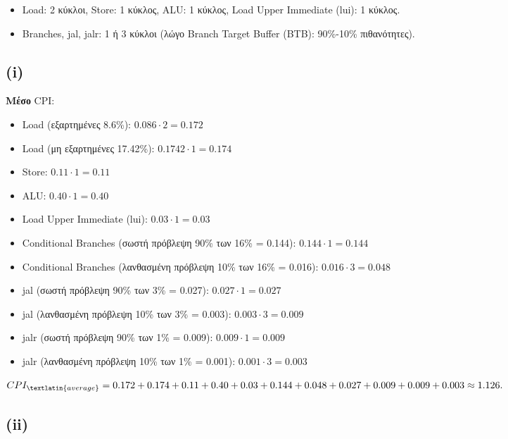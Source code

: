 \documentclass{article}
\newcommand{\skato}{\hspace{0.25cm}}
\begin{document}
\begin{itemize}
    \item \textlatin{Load}: 2 κύκλοι, \skato \textlatin{Store}: 1 κύκλος, \skato \textlatin{ALU}: 1 κύκλος, \skato \textlatin{Load Upper Immediate (lui)}: 1 κύκλος. 
    \item  \textlatin{Branches}, \textlatin{jal}, \textlatin{jalr}: 1 {ή} 3 {κύκλοι (λώγο \textlatin{Branch Target Buffer (BTB)}: 90\%-10\% πιθανότητες).}
\end{itemize}


\subsection*{(\textlatin{i})}

\textbf{Μέσο} \textlatin{CPI}:
\begin{itemize}
    \item \textlatin{Load} (εξαρτημένες 8.6\%): \( 0.086 \cdot 2 = 0.172 \)
    \item \textlatin{Load} (μη εξαρτημένες 17.42\%): \( 0.1742 \cdot 1 = 0.174 \)
    \item \textlatin{Store}: \( 0.11 \cdot 1 = 0.11 \)
    \item \textlatin{ALU}: \( 0.40 \cdot 1 = 0.40 \)
    \item \textlatin{Load Upper Immediate (lui)}: \( 0.03 \cdot 1 = 0.03 \)
    \item \textlatin{Conditional Branches} (σωστή πρόβλεψη 90\% των 16\% = 0.144): \( 0.144 \cdot 1 = 0.144 \)
    \item \textlatin{Conditional Branches} (λανθασμένη πρόβλεψη 10\% των 16\% = 0.016): \( 0.016 \cdot 3 = 0.048 \)
    \item \textlatin{jal} (σωστή πρόβλεψη 90\% των 3\% = 0.027): \( 0.027 \cdot 1 = 0.027 \)
    \item \textlatin{jal} (λανθασμένη πρόβλεψη 10\% των 3\% = 0.003): \( 0.003 \cdot 3 = 0.009 \)
    \item \textlatin{jalr} (σωστή πρόβλεψη 90\% των 1\% = 0.009): \( 0.009 \cdot 1 = 0.009 \)
    \item \textlatin{jalr} (λανθασμένη πρόβλεψη 10\% των 1\% = 0.001): \( 0.001 \cdot 3 = 0.003 \)
\end{itemize}
$ CPI_{\textlatin{average}} = 0.172 + 0.174 + 0.11 + 0.40 + 0.03 + 0.144 + 0.048 + 0.027 + 0.009 + 0.009 + 0.003 \approx 1.126. $ 


\subsection*{\textlatin{(ii)}}
\end{document}

